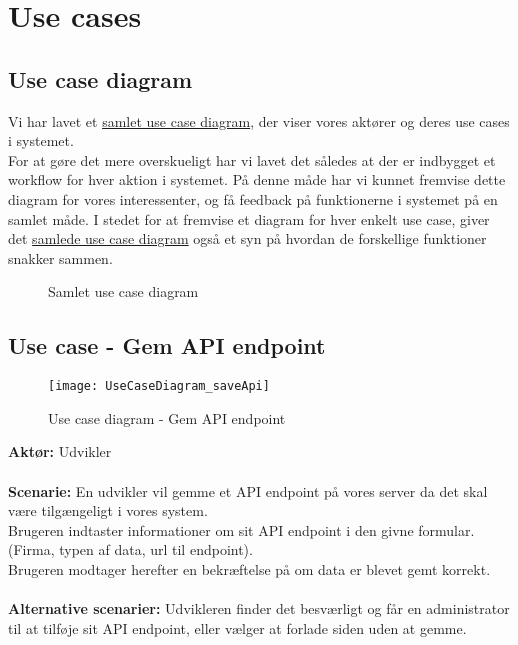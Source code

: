 \section{Use cases}
\subsection{Use case diagram}
Vi har lavet et \hyperref[fig:usecase-complete]{samlet use case diagram}, der viser vores aktører og deres use cases i systemet.\\
For at gøre det mere overskueligt har vi lavet det således at der er indbygget et workflow for hver aktion i systemet.
På denne måde har vi kunnet fremvise dette diagram for vores interessenter, og få feedback på funktionerne i systemet på en samlet måde.
I stedet for at fremvise et diagram for hver enkelt use case, giver det \hyperref[fig:usecase-complete]{samlede use case diagram} også et syn på hvordan de forskellige funktioner snakker sammen.
\begin{figure}[H]
    \caption{Samlet use case diagram}
    \label{fig:usecase-complete}
\end{figure}
\subsection{Use case - Gem API endpoint}
\begin{figure}[H]
    \texttt{[image: UseCaseDiagram\_saveApi]}
    \caption{Use case diagram - Gem API endpoint}
    \label{fig:usecase-saveApi}
\end{figure}
\textbf{Aktør:} Udvikler
\\\\
\textbf{Scenarie:} En udvikler vil gemme et API endpoint på vores server da det skal være tilgængeligt i vores system. \\
Brugeren indtaster informationer om sit API endpoint i den givne formular. (Firma, typen af data, url til endpoint). \\
Brugeren modtager herefter en bekræftelse på om data er blevet gemt korrekt.
\\\\
\textbf{Alternative scenarier:} Udvikleren finder det besværligt og får en administrator til at tilføje sit API endpoint,
eller vælger at forlade siden uden at gemme.
\hypertarget{Systemsekvensdiagram}{}

